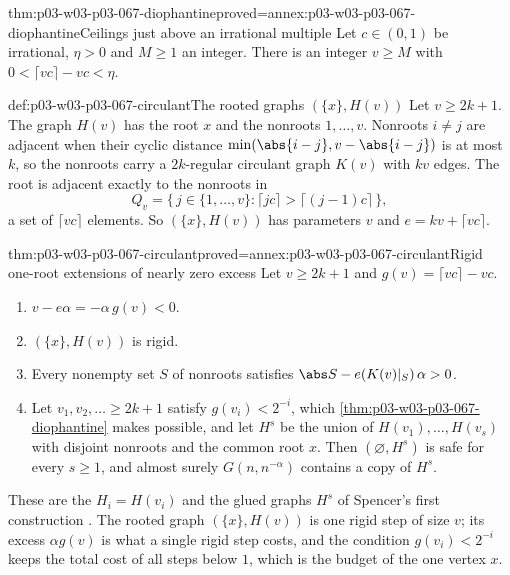 \begin{hblemma}{thm:p03-w03-p03-067-diophantine}{proved=annex:p03-w03-p03-067-diophantine}{Ceilings just above an irrational multiple}
Let \(c\in(0,1)\) be irrational, \(\eta>0\) and \(M\geq1\) an integer.  There
is an integer \(v\geq M\) with \(0<\lceil vc\rceil-vc<\eta\).
\end{hblemma}

\begin{hbdefinition}{def:p03-w03-p03-067-circulant}{The rooted graphs \((\{x\},H(v))\)}
Let \(v\geq2k+1\).  The graph \(H(v)\) has the root \(x\) and the nonroots
\(1,\ldots,v\).  Nonroots \(i\neq j\) are adjacent when their cyclic distance
\(\min(\abs{i-j},v-\abs{i-j})\) is at most \(k\), so the nonroots carry a
\(2k\)-regular circulant graph \(K(v)\) with \(kv\) edges.  The root is
adjacent exactly to the nonroots in
\[
 Q_v=\{\,j\in\{1,\ldots,v\}:\lceil jc\rceil>\lceil (j-1)c\rceil\,\},
\]
a set of \(\lceil vc\rceil\) elements.  So \((\{x\},H(v))\) has parameters
\(v\) and \(e=kv+\lceil vc\rceil\).
\end{hbdefinition}

\begin{hbtheorem}{thm:p03-w03-p03-067-circulant}{proved=annex:p03-w03-p03-067-circulant}{Rigid one-root extensions of nearly zero excess}
Let \(v\geq2k+1\) and \(g(v)=\lceil vc\rceil-vc\).
\begin{enumerate}
\item \(v-e\alpha=-\alpha\,g(v)<0\).
\item \((\{x\},H(v))\) is rigid.
\item Every nonempty set \(S\) of nonroots satisfies
  \(\abs S-e(K(v)|_S)\,\alpha>0\).
\item Let \(v_1,v_2,\ldots\geq2k+1\) satisfy \(g(v_i)<2^{-i}\), which
  \cref{thm:p03-w03-p03-067-diophantine} makes possible, and let \(H^s\)
  be the union of \(H(v_1),\ldots,H(v_s)\) with disjoint nonroots and the
  common root \(x\).  Then \((\varnothing,H^s)\) is safe for every
  \(s\geq1\), and almost surely \(G(n,n^{-\alpha})\) contains a copy of
  \(H^s\).
\end{enumerate}
\end{hbtheorem}

These are the \(H_i=H(v_i)\) and the glued graphs \(H^s\) of Spencer's first
construction \cite[p.~14]{Spencer2007LogicRandomStructuresAuthor}.  The
rooted graph \((\{x\},H(v))\) is one rigid step of size \(v\); its excess
\(\alpha g(v)\) is what a single rigid step costs, and the condition
\(g(v_i)<2^{-i}\) keeps the total cost of all steps below \(1\), which is the
budget of the one vertex \(x\).

